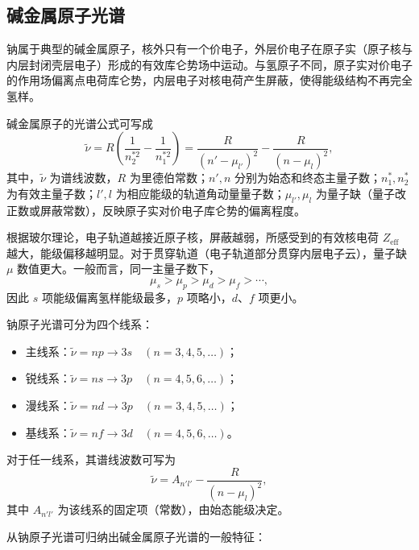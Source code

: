 \documentclass[a4paper,8pt,twocolumn]{article}
\begin{document}
\subsection{碱金属原子光谱}

钠属于典型的碱金属原子，核外只有一个价电子，外层价电子在原子实（原子核与内层封闭壳层电子）形成的有效库仑势场中运动。与氢原子不同，原子实对价电子的作用场偏离点电荷库仑势，内层电子对核电荷产生屏蔽，使得能级结构不再完全氢样。

碱金属原子的光谱公式可写成
\begin{equation}
  \tilde{\nu}
  = R\!\left(
      \frac{1}{n_2^{*2}} - \frac{1}{n_1^{*2}}
    \right)
  = \frac{R}{(n'-\mu_{l'})^2}
    - \frac{R}{(n-\mu_l)^2},
  \tag{E4.1}
\end{equation}
其中，$\tilde{\nu}$ 为谱线波数，$R$ 为里德伯常数；$n',n$ 分别为始态和终态主量子数；$n^*_1,n^*_2$ 为有效主量子数；$l',l$ 为相应能级的轨道角动量量子数；$\mu_{l'},\mu_l$ 为量子缺（量子改正数或屏蔽常数），反映原子实对价电子库仑势的偏离程度。

根据玻尔理论，电子轨道越接近原子核，屏蔽越弱，所感受到的有效核电荷 $Z_{\mathrm{eff}}$ 越大，能级偏移越明显。对于贯穿轨道（电子轨道部分贯穿内层电子云），量子缺 $\mu$ 数值更大。一般而言，同一主量子数下，
\[
  \mu_s > \mu_p > \mu_d > \mu_f > \cdots,
\]
因此 $s$ 项能级偏离氢样能级最多，$p$ 项略小，$d$、$f$ 项更小。

钠原子光谱可分为四个线系：
\begin{itemize}
  \item 主线系：$\tilde{\nu} = np \rightarrow 3s \quad (n=3,4,5,\dots)$；
  \item 锐线系：$\tilde{\nu} = ns \rightarrow 3p \quad (n=4,5,6,\dots)$；
  \item 漫线系：$\tilde{\nu} = nd \rightarrow 3p \quad (n=3,4,5,\dots)$；
  \item 基线系：$\tilde{\nu} = nf \rightarrow 3d \quad (n=4,5,6,\dots)$。
\end{itemize}

对于任一线系，其谱线波数可写为
\begin{equation}
  \tilde{\nu}
  = A_{n'l'} - \frac{R}{(n-\mu_l)^2},
  \tag{E4.2}
\end{equation}
其中 $A_{n'l'}$ 为该线系的固定项（常数），由始态能级决定。

从钠原子光谱可归纳出碱金属原子光谱的一般特征：
\end{document}
